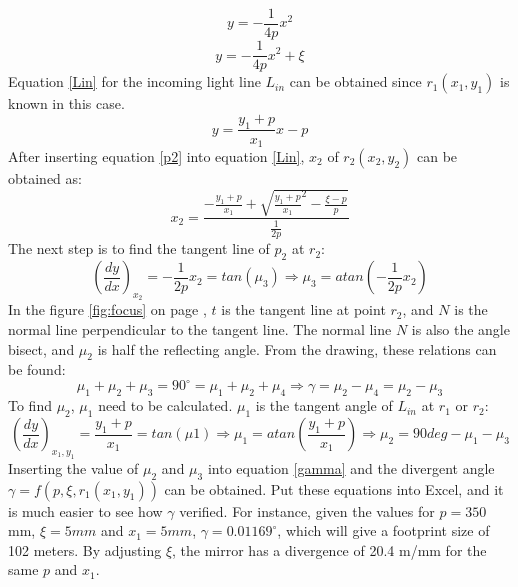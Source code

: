 \begin{equation}
\label{p1}
y = -\frac{1}{4p}x^{2}
\end {equation}
\begin{equation}
\label{p2}
y = -\frac{1}{4p}x^{2}+\xi
\end {equation}
Equation \ref{Lin} for the incoming light line $L_{in}$ can be obtained since $r_{1}(x_{1}, y_{1})$ is known in this case. 
\begin{equation}
\label{Lin}
y = \frac{y_{1}+p}{x_{1}}x-p
\end {equation}
After inserting equation \ref{p2} into equation \ref{Lin}, $x_{2}$ of $r_{2}(x_{2}, y_{2})$ can be obtained as:
\begin{equation}
\label{x2}
x_{2} = \frac{-\frac{y_{1}+p}{x_{1}}+\sqrt{{\frac{y_{1}+p}{x_{1}}}^2-\frac{\xi-p}{p}}}{\frac{1}{2p}}
\end {equation}
The next step is to find the tangent line of $p_{2}$ at $r_{2}$:
\begin{equation}
\label{miu3}
(\frac{dy}{dx})_{x_{2}} = -\frac{1}{2p}x_{2} = tan(\mu_{3}) \Rightarrow \mu_{3} = atan(-\frac{1}{2p}x_{2})
\end {equation}
In the figure \ref{fig:focus} on page \pageref{fig:focus}, $t$ is the tangent line at point $r_{2}$, and $N$ is the normal line perpendicular to the tangent line. The normal line $N$ is also the angle bisect, and $\mu_{2}$ is half the reflecting angle. From the drawing, these relations can be found:
\begin{equation}
\label{gamma}
\mu_{1}+\mu_{2}+\mu_{3} = 90^{\circ} = \mu_{1}+\mu_{2}+\mu_{4}
\Longrightarrow \gamma = \mu_{2} - \mu_{4} = \mu_{2} - \mu_{3} 
\end {equation}
To find $\mu_{2}$, $\mu_{1}$ need to be calculated. $\mu_{1}$ is the tangent angle of $L_{in}$ at $r_{1}$ or $r_{2}$:
\begin{equation}
\label{miu2}
(\frac{dy}{dx})_{x_{1},y_{1}} = \frac{y_{1}+p}{x_{1}} = tan(\mu{1})\Rightarrow \mu_{1} = atan(\frac{y_{1}+p}{x_{1}}) \Rightarrow \mu_{2} = 90deg - \mu_{1} - \mu_{3}
\end {equation}
Inserting the value of $\mu_{2}$ and $\mu_{3}$ into equation \ref{gamma} and the divergent angle $\gamma = f(p, \xi, r_{1}(x_{1}, y_{1}))$ can be obtained. Put these equations into Excel, and it is much easier to see how $\gamma$ verified. For instance, given the values for $p = 350$ mm, $\xi = 5 mm$ and $x_{1} = 5 mm$, $\gamma = 0.01169^{\circ}$, which will give a footprint size of 102 meters. By adjusting $\xi$, the mirror has a divergence of 20.4 m/mm for the same $p$ and $x_{1}$.

